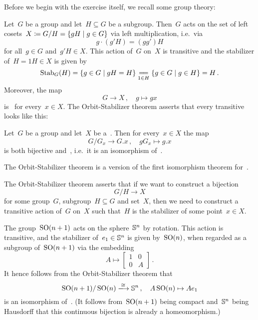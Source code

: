 \section{}

Before we begin with the exercise itself, we recall some group theory:

Let~$G$ be a group and let~$H \subseteq G$ be a subgroup.
Then~$G$ acts on the set of left cosets~$X \defined G/H = \{ gH \suchthat g \in G\}$ via left multiplication, i.e.\ via
\[
    g \cdot (g' H)
  = (g g') H
\]
for all~$g \in G$ and~$g'H \in X$.
This action of~$G$ on~$X$ is transitive and the stabilizer of~$H = 1H \in X$ is given by
\[
    \Stab_G(H)
  = \{
      g \in G
    \suchthat
      gH = H
    \}
  \underset{1 \in H}{\longequal}
    \{
      g \in G
    \suchthat
      g \in H
    \}
  = H \,.
\]
Moreover, the map
\[
          G
  \to     X \,,
  \quad   g
  \mapsto gx
\]
is~ for every~$x \in X$.
The Orbit-Stabilizer theorem asserts that every transitive~ looks like this:

\begin{theorem}
  Let~$G$ be a group and let~$X$ be a~.
  Then for every~$x \in X$ the map
  \[
            G/G_x
    \to     G.x \,,
    \quad   gG_x
    \mapsto g.x
  \]
  is both bijective and~, i.e.\ it is an isomorphism of~.
\end{theorem}

\begin{remark}
  The Orbit-Stabilizer theorem is a version of the first isomorphism theorem for~.
\end{remark}


The Orbit-Stabilizer theorem asserts that if we want to construct a bijection
\[
  G/H \to X
\]
for some group~$G$, subgroup~$H \subseteq G$ and set~$X$, then we need to construct a transitive action of~$G$ on~$X$ such that~$H$ is the stabilizer of some point~$x \in X$.

\begin{example}[Topology]
  The group~$\operatorname{SO}(n+1)$ acts on the sphere~$\mathbb{S}^n$ by rotation.
  This action is transitive, and the stabilizer of~$e_1 \in \mathbb{S}^n$ is given by~$\operatorname{SO}(n)$, when regarded as a subgroup of~$\operatorname{SO}(n+1)$ via the embedding
  \[
            A
    \mapsto \begin{bmatrix}
              1 & 0 \\
              0 & A
            \end{bmatrix} \,.
  \]
  It hence follows from the Orbit-Stabilizer theorem that
  \[
                    \SO(n+1)/\SO(n)
    \xlongto{\cong} \sphere^n \,,
    \quad           A \SO(n)
    \mapsto         A e_1
  \]
  is an isomorphism of~.
  (It follows from~$\operatorname{SO}(n+1)$ being compact and~$\mathbb{S}^n$ being Hausdorff that this continuous bijection is already a homeomorphism.)
\end{example}





